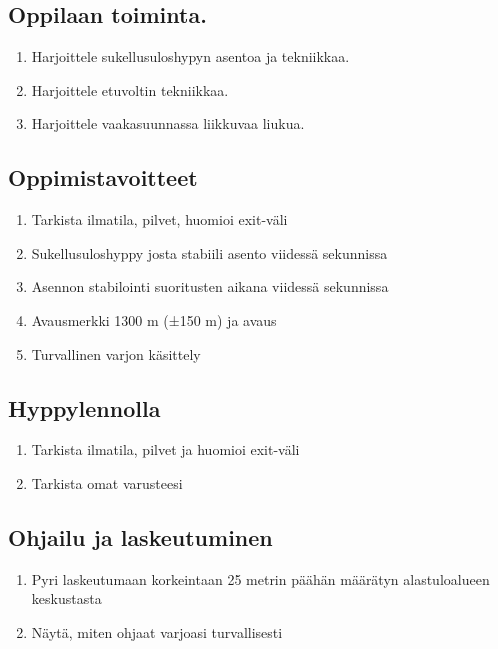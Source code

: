 \begin{multicols}{2}
\subsection{ Oppilaan toiminta. }
\label{nova-alkeiskoulutuksen-suoritukset-oppilaan-toiminta}

\begin{enumerate}[label=\bfseries \arabic*)]
\item  Harjoittele sukellusuloshypyn asentoa ja tekniikkaa. 
\item  Harjoittele etuvoltin tekniikkaa. 
\item  Harjoittele vaakasuunnassa liikkuvaa liukua. 
\end{enumerate}
\subsection{ Oppimistavoitteet }
\label{nova-alkeiskoulutuksen-suoritukset-oppimistavoitteet}

\begin{enumerate}[label=\bfseries \arabic*)]
\item  Tarkista ilmatila, pilvet, huomioi exit-väli 
\item  Sukellusuloshyppy josta stabiili asento viidessä sekunnissa 
\item  Asennon stabilointi suoritusten aikana viidessä sekunnissa 
\item  Avausmerkki 1300 m (±150 m) ja avaus  
\item  Turvallinen varjon käsittely 
\end{enumerate}
\subsection{ Hyppylennolla }
\label{nova-alkeiskoulutuksen-suoritukset-hyppylennolla}

\begin{enumerate}[label=\bfseries \arabic*)]
\item  Tarkista ilmatila, pilvet ja huomioi exit-väli  
\item  Tarkista omat varusteesi 
\end{enumerate}
\subsection{ Ohjailu ja laskeutuminen }
\label{nova-alkeiskoulutuksen-suoritukset-ohjailu-ja-laskeutuminen}

\begin{enumerate}[label=\bfseries \arabic*)]
\item  Pyri laskeutumaan korkeintaan 25 metrin päähän määrätyn alastuloalueen keskustasta 
\item  Näytä, miten ohjaat varjoasi turvallisesti  
\end{enumerate}

\end{multicols}
